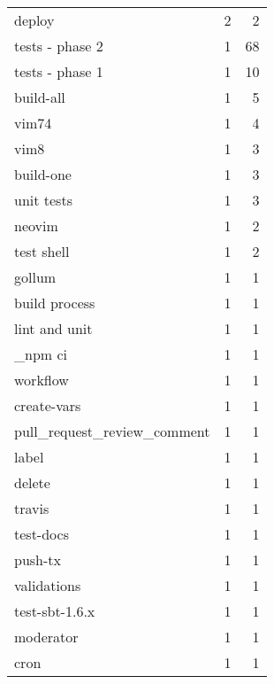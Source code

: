 \begin{tabular}{lrr}
deploy                      &                   2 &             2 \\
tests - phase 2             &                   1 &            68 \\
tests - phase 1             &                   1 &            10 \\
build-all                   &                   1 &             5 \\
vim74                       &                   1 &             4 \\
vim8                        &                   1 &             3 \\
build-one                   &                   1 &             3 \\
unit tests                  &                   1 &             3 \\
neovim                      &                   1 &             2 \\
test shell                  &                   1 &             2 \\
gollum                      &                   1 &             1 \\
build process               &                   1 &             1 \\
lint and unit               &                   1 &             1 \\
\_npm ci                     &                   1 &             1 \\
workflow                    &                   1 &             1 \\
create-vars                 &                   1 &             1 \\
pull\_request\_review\_comment &                   1 &             1 \\
label                       &                   1 &             1 \\
delete                      &                   1 &             1 \\
travis                      &                   1 &             1 \\
test-docs                   &                   1 &             1 \\
push-tx                     &                   1 &             1 \\
validations                 &                   1 &             1 \\
test-sbt-1.6.x              &                   1 &             1 \\
moderator                   &                   1 &             1 \\
cron                        &                   1 &             1 \\
\bottomrule
\end{tabular}
